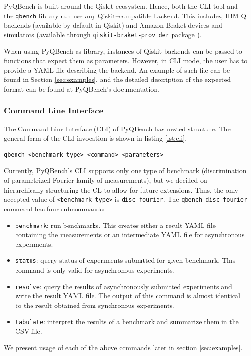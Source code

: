 \documentclass[preprint,12pt, a4paper, dvipsnames]{elsarticle}
\newcommand{\1}{{\rm 1\hspace{-0.9mm}l}}
\theoremstyle{definition}
\begin{document}
PyQBench is built around the Qiskit \cite{qiskit} ecosystem. Hence, both the CLI tool and the
\texttt{qbench} library can use any Qiskit--compatible backend. This includes, IBM Q backends
(available by default in Qiskit) and Amazon Braket devices and simulators (available through
\texttt{qiskit-braket-provider} package \cite{qiskit-braket-provider,
qiskit-braket-provider-github}).

When using PyQBench as library, instances of Qiskit backends can be passed to functions that expect
them as parameters. However, in CLI mode, the user has to provide a YAML file describing the
backend. An example of such file can be found in Section \ref{sec:examples}, and the detailed
description of the expected format can be found at PyQBench's documentation.

\subsubsection{Command Line Interface}
\label{sec:cli}

The Command Line Interface (CLI) of PyQBench has nested structure. The general form of the CLI
invocation is shown in listing \ref{lst:cli}.
\begin{lstlisting}[caption=Invocation of \texttt{qbench} script, label=lst:cli]
qbench <benchmark-type> <command> <parameters>
\end{lstlisting}
Currently, PyQBench's CLI supports only one type of benchmark (discrimination of parametrized
Fourier family of measurements), but we decided on hierarchically structuring the CL to allow for
future extensions. Thus, the only accepted value of \texttt{<benchmark-type>} is
\texttt{disc-fourier}.
%
The \texttt{qbench disc-fourier} command has four subcommands:

\begin{itemize}
	\item \texttt{benchmark}: run benchmarks. This creates either a result YAML file containing the
		measurements or an intermediate YAML file for asynchronous experiments.
	\item \texttt{status}: query status of experiments submitted for given benchmark. This command
		is only valid for asynchronous experiments.
	\item \texttt{resolve}: query the results of asynchronously submitted experiments and write the
		result YAML file. The output of this command is almost identical to the result obtained from
		synchronous experiments.
	\item \texttt{tabulate}: interpret the results of a benchmark and summarize them in the CSV
	file.
\end{itemize}
%
We present usage of each of the above commands later in section \ref{sec:examples}.
\end{document}
